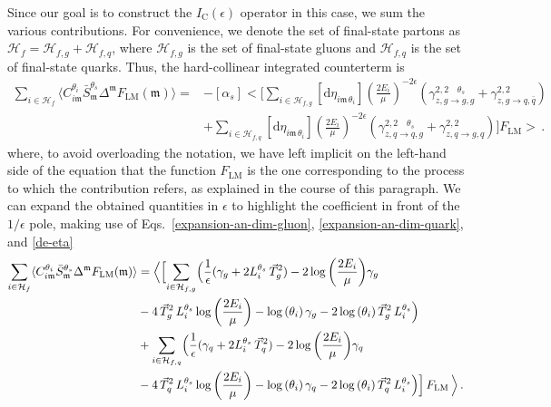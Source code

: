 \documentclass[a4paper, 12pt]{book}
\newcommand{\um}{\mathfrak{m}}
\begin{document}
Since our goal is to construct the $I_{\mathrm{C}}(\epsilon)$ operator in this case, we sum the various contributions. For convenience, we denote the set of final-state partons as $\mathcal{H}_f = \mathcal{H}_{f,g} + \mathcal{H}_{f,q}$, where $\mathcal{H}_{f,g}$ is the set of final-state gluons and $\mathcal{H}_{f,q}$ is the set of final-state quarks. Thus, the hard-collinear integrated counterterm is
\begin{equation}
  \begin{aligned}
     \sum_{i \in \mathcal{H}_f} \langle C_{i\mathfrak{m}}^{\theta_i} \bar{S}_{\mathfrak{m}}^{\theta_s} \Delta^{\mathfrak{m}} F_{\mathrm{LM}}(\mathfrak{m})\rangle =& - [\alpha_s] \biggl< \Biggl[ \sum_{i \in \mathcal{H}_{f,g}} [\mathrm{d}\eta_{i\um \, \theta_i}] \left(\frac{2E_i}{\mu}\right)^{-2\epsilon}(\gamma^{2,2 \quad \theta_s}_{z,g \to g, g}+ \gamma^{2,2}_{z,g \to q, \bar{q}}) \\
     & + \sum_{i \in \mathcal{H}_{f,q}} [\mathrm{d}\eta_{i\um \, \theta_i}] \left(\frac{2E_i}{\mu}\right)^{-2\epsilon}(\gamma^{2,2 \quad \theta_s}_{z,q \to q, g}+ \gamma^{2,2}_{z,q \to g, q}) \Biggr] F_{\mathrm{LM}} \biggr> \, .
  \end{aligned}
\end{equation}
where, to avoid overloading the notation, we have left implicit on the left-hand side of the equation that the function $F_{\mathrm{LM}}$ is the one corresponding to the process to which the contribution refers, as explained in the course of this paragraph. We can expand the obtained quantities in $\epsilon$ to highlight the coefficient in front of the $1/\epsilon$ pole, making use of Eqs.~\ref{expansion-an-dim-gluon}, \ref{expansion-an-dim-quark}, and \ref{de-eta}
\begin{equation}
  \begin{aligned}
     \sum_{i \in \mathcal{H}_f} \langle C_{i\mathfrak{m}}^{\theta_i} \bar{S}_{\mathfrak{m}}^{\theta_s} \Delta^{\mathfrak{m}} F_{\mathrm{LM}}(\mathfrak{m})\rangle &= \Bigl<  \Bigl[\sum_{i \in \mathcal{H}_{f,g}} \Bigl( \frac{1}{\epsilon}(\gamma_g +  2 L_i^{\theta_s} \,\vec{T}_g^2) - 2 \log{\left(\frac{2E_i}{\mu}\right)}\gamma_g \\
      & - 4 \, \vec{T}_g^2 \, L_i^{\theta_s} \log{\left(\frac{2E_i}{\mu}\right)} - \log{(\theta_i)} \, \gamma_g - 2 \log{(\theta_i)} \, \vec{T}_g^2 \, L_i^{\theta_s}  \Bigr) \\
      & +\sum_{i \in \mathcal{H}_{f,q}} \Bigl( \frac{1}{\epsilon}(\gamma_q+  2 L_i^{\theta_s} \,\vec{T}_q^2) - 2 \log{\left(\frac{2E_i}{\mu}\right)}\gamma_q\\
      & - 4 \, \vec{T}_q^2 \, L_i^{\theta_s} \log{\left(\frac{2E_i}{\mu}\right)} - \log{(\theta_i)} \, \gamma_q - 2 \log{(\theta_i)} \, \vec{T}_q^2 \, L_i^{\theta_s}  \Bigr)  \Bigr]\, F_{\mathrm{LM}} \, \Bigr > \, .
  \end{aligned}
\end{equation}
\end{document}
